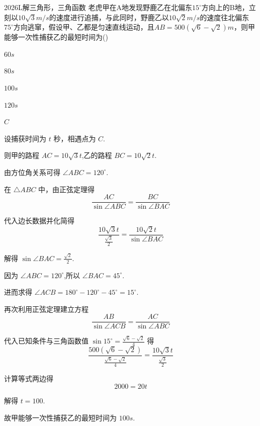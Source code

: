 
\begin{problem}{2026}{L}{}{}{解三角形，三角函数}
老虎甲在A地发现野鹿乙在北偏东$15^{\circ}$方向上的B地，立刻以$10\sqrt{3}m/s$的速度进行追捕，与此同时，野鹿乙以$10\sqrt{2}m/s$的速度往北偏东$75^{\circ}$方向逃窜，假设甲、乙都是匀速直线运动，且$AB=500(\sqrt{6}-\sqrt{2})m$，则甲能够一次性捕获乙的最短时间为(\hspace{1cm})
\begin{choices}
\item$60s$
\item$80s$
\item$100s$
\item$120s$
\end{choices}
\end{problem}

\begin{answer}
$C$
\end{answer}

\begin{solutions}
设捕获时间为 $t$ 秒，相遇点为 $C$.

则甲的路程 $AC = 10\sqrt{3}t$,乙的路程 $BC = 10\sqrt{2}t$.

由方位角关系可得 $\angle ABC = 120^{\circ}$.

在 $\triangle ABC$ 中，由正弦定理得
$$
\displaystyle \frac{AC}{\sin \angle ABC} = \displaystyle \frac{BC}{\sin \angle BAC}
$$

代入边长数据并化简得
$$
\displaystyle \frac{10\sqrt{3}t}{\displaystyle \frac{\sqrt{3}}{2}} = \displaystyle \frac{10\sqrt{2}t}{\sin \angle BAC}
$$

解得 $\sin \angle BAC = \displaystyle \frac{\sqrt{2}}{2}$.

因为 $\angle ABC = 120^{\circ}$,所以 $\angle BAC = 45^{\circ}$.

进而求得 $\angle ACB = 180^{\circ} - 120^{\circ} - 45^{\circ} = 15^{\circ}$.

再次利用正弦定理建立方程
$$
\displaystyle \frac{AB}{\sin \angle ACB} = \displaystyle \frac{AC}{\sin \angle ABC}
$$

代入已知条件与三角函数值 $\sin 15^{\circ} = \displaystyle \frac{\sqrt{6}-\sqrt{2}}{4}$ 得
$$
\displaystyle \frac{500\left(\sqrt{6}-\sqrt{2}\right)}{\displaystyle \frac{\sqrt{6}-\sqrt{2}}{4}} = \displaystyle \frac{10\sqrt{3}t}{\displaystyle \frac{\sqrt{3}}{2}}
$$

计算等式两边得
$$
2000 = 20t
$$

解得 $t = 100$.

故甲能够一次性捕获乙的最短时间为 $100s$.

\end{solutions}